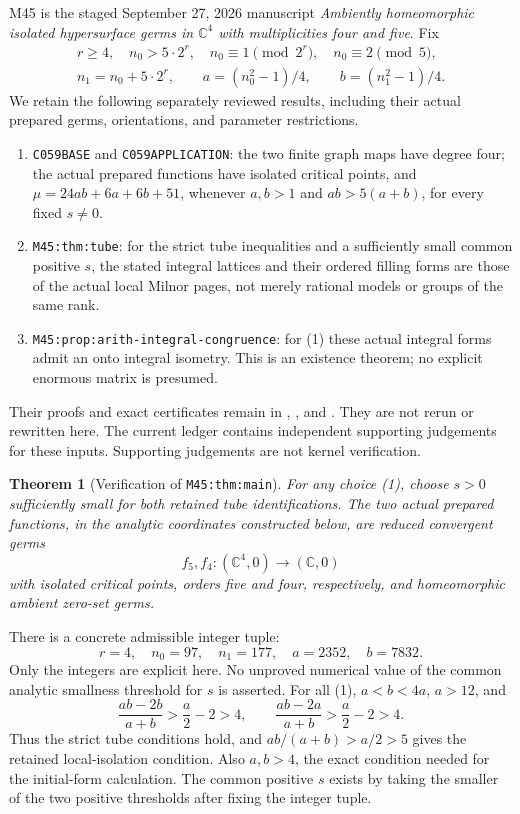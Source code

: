 \documentclass[11pt]{article}
\newtheorem{theorem}{Theorem}
\newcommand{\C}{\mathbb C}
\begin{document}
M45 is the staged September 27, 2026 manuscript
\emph{Ambiently homeomorphic isolated hypersurface germs in
\(\C^4\) with multiplicities four and five}.
Fix
\[
\begin{gathered}
r\geq4,\quad n_0>5\cdot2^r,\quad
n_0\equiv1\pmod{2^r},\quad n_0\equiv2\pmod5,\\
n_1=n_0+5\cdot2^r,\qquad
a=(n_0^2-1)/4,\qquad b=(n_1^2-1)/4.
\end{gathered}                                                    \tag{1}
\]
We retain the following separately reviewed results, including their
actual prepared germs, orientations, and parameter restrictions.
\begin{enumerate}
\item \texttt{C059BASE} and \texttt{C059APPLICATION}: the two finite
graph maps have degree four; the actual prepared functions have isolated
critical points, and
\(\mu=24ab+6a+6b+51\), whenever \(a,b>1\) and \(ab>5(a+b)\),
for every fixed \(s\ne0\).
\item \texttt{M45:thm:tube}: for the strict tube inequalities and a
sufficiently small common positive \(s\), the stated integral lattices
and their ordered filling forms are those of the actual local
Milnor pages, not merely rational models or groups of the same rank.
\item \texttt{M45:prop:arith-integral-congruence}: for (1) these actual
integral forms admit an onto integral isometry. This is an existence
theorem; no explicit enormous matrix is presumed.
\end{enumerate}
Their proofs and exact certificates remain in
,
, and
. They are not rerun or rewritten here.
The current ledger contains independent supporting judgements for
these inputs. Supporting judgements are not kernel verification.

\begin{theorem}[Verification of \texttt{M45:thm:main}]\label{thm:main}
For any choice (1), choose \(s>0\) sufficiently small for both retained
tube identifications. The two actual prepared functions, in the analytic
coordinates constructed below, are reduced convergent germs
\[
f_5,f_4:(\C^4,0)\longrightarrow(\C,0)
\]
with isolated critical points, orders five and four, respectively, and
homeomorphic ambient zero-set germs.
\end{theorem}

There is a concrete admissible integer tuple:
\[
r=4,\quad n_0=97,\quad n_1=177,\quad a=2352,\quad b=7832.             \tag{2}
\]
Only the integers are explicit here. No unproved numerical value of the
common analytic smallness threshold for \(s\) is asserted.
For all (1), \(a<b<4a\), \(a>12\), and
\[
\frac{ab-2b}{a+b}>\frac a2-2>4,\qquad
\frac{ab-2a}{a+b}>\frac a2-2>4.
\]
Thus the strict tube conditions hold, and
\(ab/(a+b)>a/2>5\) gives the retained local-isolation condition.
Also \(a,b>4\), the exact condition needed for the initial-form
calculation. The common positive \(s\) exists by taking the smaller of
the two positive thresholds after fixing the integer tuple.
\end{document}
